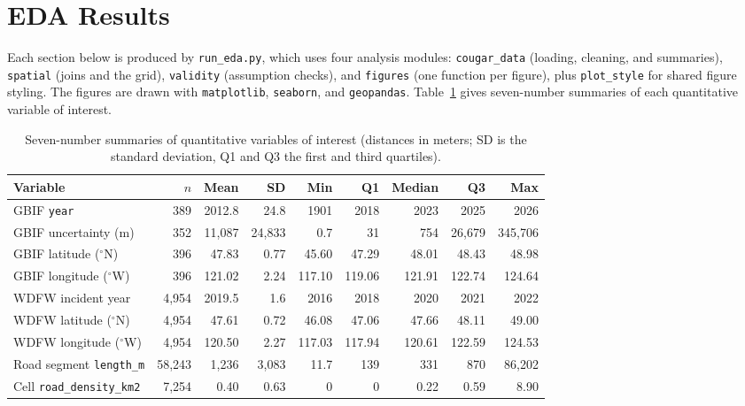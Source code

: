 \documentclass[11pt, a4paper]{article}
\begin{document}
\section{EDA Results}
Each section below is produced by \texttt{run\_eda.py}, which uses four analysis modules: \texttt{cougar\_data} (loading, cleaning, and summaries), \texttt{spatial} (joins and the grid), \texttt{validity} (assumption checks), and \texttt{figures} (one function per figure), plus \texttt{plot\_style} for shared figure styling. The figures are drawn with \texttt{matplotlib}, \texttt{seaborn}, and \texttt{geopandas}. Table~\ref{tab:seven} gives seven-number summaries of each quantitative variable of interest.

\begin{table}[!htb]
  \centering
  \caption{Seven-number summaries of quantitative variables of interest (distances in meters; SD is the standard deviation, Q1 and Q3 the first and third quartiles).}
  \label{tab:seven}
  \setlength{\tabcolsep}{4pt}
  \begin{tabular}{lrrrrrrrr}
    \toprule
    Variable                         & $n$    & Mean   & SD     & Min    & Q1     & Median & Q3     & Max     \\
    \midrule
    GBIF \texttt{year}               & 389    & 2012.8 & 24.8   & 1901   & 2018   & 2023   & 2025   & 2026    \\
    GBIF uncertainty (m)             & 352    & 11,087 & 24,833 & 0.7    & 31     & 754    & 26,679 & 345,706 \\
    GBIF latitude ($^\circ$N)        & 396    & 47.83  & 0.77   & 45.60  & 47.29  & 48.01  & 48.43  & 48.98   \\
    GBIF longitude ($^\circ$W)       & 396    & 121.02 & 2.24   & 117.10 & 119.06 & 121.91 & 122.74 & 124.64  \\
    WDFW incident year               & 4,954  & 2019.5 & 1.6    & 2016   & 2018   & 2020   & 2021   & 2022    \\
    WDFW latitude ($^\circ$N)        & 4,954  & 47.61  & 0.72   & 46.08  & 47.06  & 47.66  & 48.11  & 49.00   \\
    WDFW longitude ($^\circ$W)       & 4,954  & 120.50 & 2.27   & 117.03 & 117.94 & 120.61 & 122.59 & 124.53  \\
    Road segment \texttt{length\_m}  & 58,243 & 1,236  & 3,083  & 11.7   & 139    & 331    & 870    & 86,202  \\
    Cell \texttt{road\_density\_km2} & 7,254  & 0.40   & 0.63   & 0      & 0      & 0.22   & 0.59   & 8.90    \\

\end{tabular}
\end{table}
\end{document}
